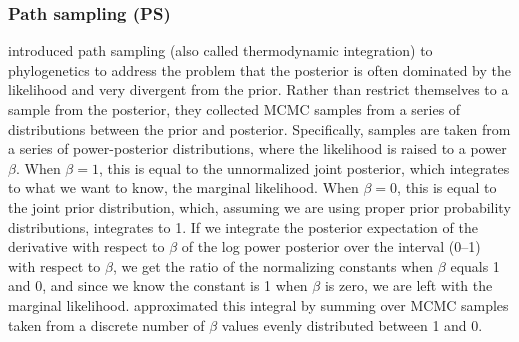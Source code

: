 \subsubsection{Path sampling (PS)}
\citet{Lartillot2006} introduced path sampling 
(also called thermodynamic integration) to phylogenetics to address the problem
that the posterior is often dominated by the likelihood and very divergent from
the prior.
Rather than restrict themselves to a sample from the posterior, they collected
MCMC samples from a series of distributions between the prior and posterior.
Specifically, samples are taken from a series of power-posterior distributions,
where the likelihood is raised to a power $\beta$.
When $\beta = 1$, this is equal to the unnormalized joint posterior, which
integrates to what we want to know, the marginal likelihood.
When $\beta = 0$, this is equal to the joint prior distribution, which,
assuming we are using proper prior probability distributions, integrates to 1.
If we integrate the  posterior expectation of the derivative
with respect to $\beta$ of the log power posterior
over the interval (0--1) with respect to $\beta$,
we get the  ratio of the normalizing constants when $\beta$
equals 1 and 0, and since we know the constant is 1 when $\beta$ is zero, we
are left with the marginal likelihood.
\citet{Lartillot2006} approximated this integral by
summing over MCMC samples taken from a discrete number of $\beta$ values evenly
distributed between 1 and 0.

